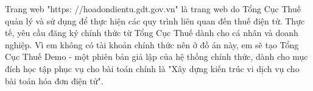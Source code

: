 Trang web "https: //hoadondientu.gdt.gov.vn" là trang web do Tổng Cục Thuế quản lý và sử dụng để thực hiện các quy trình liên quan đến thuế điện tử. Thực tế, yêu cầu đăng ký chính thức từ Tổng Cục Thuế dành cho cá nhân và doanh nghiệp. Vì em không có tài khoản chính thức nên ở đồ án này, em sẽ tạo Tổng Cục Thuế Demo - một phiên bản giả lập của hệ thống chính thức, dành cho mục đích học tập phục vụ cho bài toán chính là "Xây dựng kiến trúc vi dịch vụ cho bài toán hóa đơn điện tử".
